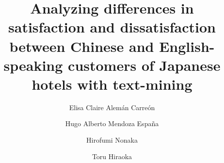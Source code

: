 \documentclass[review]{elsarticle}
\begin{document}
\begin{frontmatter}

\title{Analyzing differences in satisfaction and dissatisfaction between Chinese and English-speaking customers of Japanese hotels with text-mining}
\author[gidai]{Elisa Claire Alemán Carreón
}

\author[gidai]{Hugo Alberto Mendoza Espa\~na}

\author[gidai]{Hirofumi Nonaka}

\author[nagasaki]{Toru Hiraoka}

\address[gidai]{Nagaoka University of Technology, Nagaoka, Japan}
\address[nagasaki]{University of Nagasaki, Nagasaki, Japan}


\begin{abstract}


\end{abstract}
\end{frontmatter}
\end{document}
